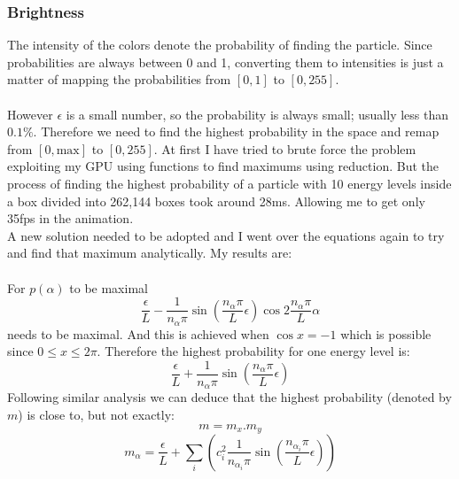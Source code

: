 \documentclass[a4paper, 10pt]{article}
\begin{document}
        \subsubsection{Brightness}
        The intensity of the colors denote the probability of finding the particle. Since
        probabilities are always between 0 and 1, converting them to intensities is just
        a matter of mapping the probabilities from $[0, 1]$ to $[0, 255]$.\\\\
        However $\epsilon$ is a small number, so the probability is always small; usually
        less than $0.1\%$. Therefore we need to find the highest probability in the space
        and remap from $[0, \text{max}]$ to $[0, 255]$. At first I have tried to brute force
        the problem exploiting my GPU using functions to find maximums using reduction. But
        the process of finding the highest probability of a particle with 10 energy levels
        inside a box divided into 262,144 boxes took around 28ms. Allowing me to get only
        35fps in the animation.\\
        A new solution needed to be adopted and I went over the equations again to try and
        find that maximum analytically. My results are:\\\\
        For $p(\alpha)$ to be maximal
        $$\frac{\epsilon}{L} - \frac{1}{n_{\alpha}\pi} \sin(\frac{n_{\alpha}\pi}{L}\epsilon)
        \cos{2\frac{n_{\alpha}\pi}{L}\alpha}$$
        needs to be maximal.  And this is achieved when $\cos{x} = -1$ which is possible
        since $0 \leq x \leq 2\pi$. Therefore the highest probability for one energy
        level is: 
        $$\frac{\epsilon}{L} + \frac{1}{n_{\alpha}\pi} \sin(\frac{n_{\alpha}\pi}{L}\epsilon)$$
        Following similar analysis we can deduce that the highest probability (denoted by
        $m$) is close to,
        but not exactly:
        $$m = m_x . m_y$$
        $$m_{\alpha} = \frac{\epsilon}{L} + \sum_i \left ( c^2_i \frac{1}{n_{\alpha_i}\pi}
        \sin\left(\frac{n_{\alpha_i}\pi}{L}\epsilon\right) \right )$$\\
        
\end{document}

